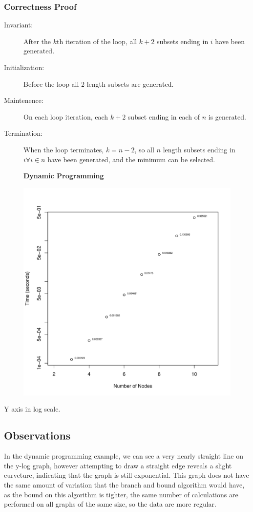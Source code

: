 \documentclass[a4paper,12pt]{article}
\begin{document}
\subsubsection{Correctness Proof}
\begin{description}
\item [Invariant: ] After the $k$th iteration of the loop, all $k + 2$ subsets ending in $i$ have been generated.
\item [Initialization: ] Before the loop all 2 length subsets are generated.
\item [Maintenence: ] On each loop iteration, each $k + 2$ subset ending in each of $n$ is generated.
\item [Termination: ] When the loop terminates, $k = n - 2$, so all $n$ length subsets ending in $i  \forall  i  \in  n$ have been generated, and the minimum can be selected.
\end{description}
\begin{figure}[H]
  \centering
  \textbf{Dynamic Programming}\par\medskip
  \includegraphics[width=1\linewidth]{DynamicProgramming.pdf}
\end{figure}
Y axis in log scale.
\subsection{Observations}
In the dynamic programming example, we can see a very nearly straight line on the y-log graph, however attempting to draw a straight edge reveals a slight curveture, indicating that the graph is still exponential. This graph does not have the same amount of variation that the branch and bound algorithm would have, as the bound on this algorithm is tighter, the same number of calculations are performed on all graphs of the same size, so the data are more regular.
\end{document}
